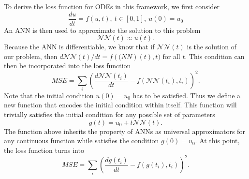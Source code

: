 To derive the loss function for \glspl{ODE} in this framework, we first consider
\begin{equation*}
    \frac{du}{dt} = f(u, t),\ t \in [0, 1],\ u(0) = u_0
\end{equation*}
An \gls{ANN} is then used to approximate the solution to this problem
\begin{equation*}
    \mathcal{NN}(t) \approx u(t).
\end{equation*}
Because the \gls{ANN} is differentiable, we know that if $\mathcal{NN}(t)$ is the solution of our problem, then $d\mathcal{NN}(t)/dt = f(\mathcal(NN)(t), t)$ for all $t$.
This condition can then be incorporated into the loss function
\begin{equation*}
    MSE = \sum_i \left( \frac{d\mathcal{NN}(t_i)}{dt} - f(\mathcal{NN}(t_i), t_i) \right)^2.
\end{equation*}
Note that the initial condition $u(0) = u_0$ has to be satisfied.
Thus we define a new function that encodes the initial condition within itself. This function will trivially satisfies the initial condition for any possible set of parameters
\begin{equation*}
    g(t) = u_0 + t\mathcal{NN}(t).
\end{equation*}
The function above inherits the property of \glspl{ANN} as universal approximators for any continuous function while satisfies the condition $g(0) = u_0$.
At this point, the loss function turns into
\begin{equation*}
    MSE = \sum_i \left( \frac{dg(t_i)}{dt} - f(g(t_i), t_i) \right)^2.
\end{equation*}

